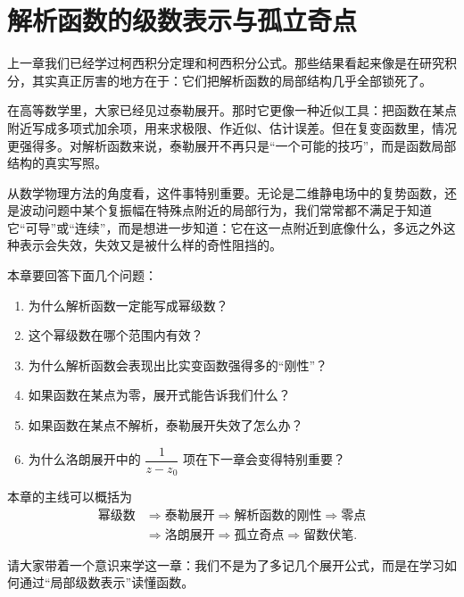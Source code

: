 
\chapter{解析函数的级数表示与孤立奇点}

\begin{wulibj}[本章导读]
上一章我们已经学过柯西积分定理和柯西积分公式。那些结果看起来像是在研究积分，其实真正厉害的地方在于：它们把解析函数的局部结构几乎全部锁死了。

在高等数学里，大家已经见过泰勒展开。那时它更像一种近似工具：把函数在某点附近写成多项式加余项，用来求极限、作近似、估计误差。但在复变函数里，情况更强得多。对解析函数来说，泰勒展开不再只是``一个可能的技巧''，而是函数局部结构的真实写照。

从数学物理方法的角度看，这件事特别重要。无论是二维静电场中的复势函数，还是波动问题中某个复振幅在特殊点附近的局部行为，我们常常都不满足于知道它``可导''或``连续''，而是想进一步知道：它在这一点附近到底像什么，多远之外这种表示会失效，失效又是被什么样的奇性阻挡的。

本章要回答下面几个问题：
\begin{enumerate}
    \item 为什么解析函数一定能写成幂级数？
    \item 这个幂级数在哪个范围内有效？
    \item 为什么解析函数会表现出比实变函数强得多的``刚性''？
    \item 如果函数在某点为零，展开式能告诉我们什么？
    \item 如果函数在某点不解析，泰勒展开失效了怎么办？
    \item 为什么洛朗展开中的 $\dfrac{1}{z-z_0}$ 项在下一章会变得特别重要？
\end{enumerate}

本章的主线可以概括为
\[
    \begin{aligned}
        \text{幂级数}
        &\Longrightarrow \text{泰勒展开}
        \Longrightarrow \text{解析函数的刚性}
        \Longrightarrow \text{零点} \\
        &\Longrightarrow \text{洛朗展开}
        \Longrightarrow \text{孤立奇点}
        \Longrightarrow \text{留数伏笔}.
    \end{aligned}
\]

请大家带着一个意识来学这一章：我们不是为了多记几个展开公式，而是在学习如何通过``局部级数表示''读懂函数。
\end{wulibj}


